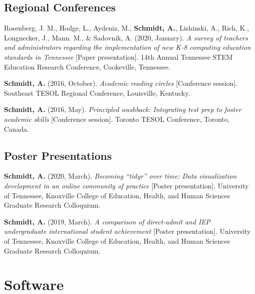 \documentclass[10pt,a4paper,]{article}
\begin{document}
\endgroup

\hypertarget{regional-conferences}{%
\subsection{Regional Conferences}\label{regional-conferences}}

\begingroup
\setlength{\parindent}{-0.5in}
\setlength{\leftskip}{0.5in}

Rosenberg, J. M., Hodge, L., Aydeniz, M., \textbf{Schmidt, A.}, Lishinski, A., Rich, K., Longnecker, J., Mann. M., \& Sadovnik, A. (2020, January). \emph{A survey of teachers and administrators regarding the implementation of new K-8 computing education standards in Tennessee} {[}Paper presentation{]}. 14th Annual Tennessee STEM Education Research Conference, Cookeville, Tennessee.

\textbf{Schmidt, A.} (2016, October). \emph{Academic reading circles} {[}Conference session{]}. Southeast TESOL Regional Conference, Louisville, Kentucky.

\textbf{Schmidt, A.} (2016, May). \emph{Principled washback: Integrating test prep to foster academic skills} {[}Conference session{]}. Toronto TESOL Conference, Toronto, Canada.

\endgroup

\hypertarget{poster-presentations}{%
\subsection{Poster Presentations}\label{poster-presentations}}

\begingroup
\setlength{\parindent}{-0.5in}
\setlength{\leftskip}{0.5in}

\textbf{Schmidt, A.} (2020, March). \emph{Becoming ``tidyr'' over time: Data visualization development in an online community of practice} {[}Poster presentation{]}. University of Tennessee, Knoxville College of Education, Health, and Human Sciences Graduate Research Colloquium.

\textbf{Schmidt, A.} (2019, March). \emph{A comparison of direct-admit and IEP undergraduate international student achievement} {[}Poster presentation{]}. University of Tennessee, Knoxville College of Education, Health, and Human Sciences Graduate Research Colloquium.

\hypertarget{software}{%
\section{Software}\label{software}}
\end{document}
